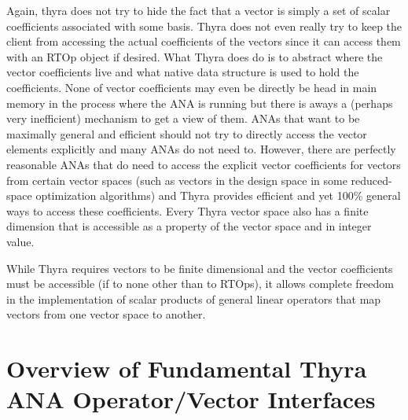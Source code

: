 \documentclass[pdf,ps2pdf,11pt]{SANDreport}
\begin{document}
Again, thyra does not try to hide the fact that a vector is simply a set of
scalar coefficients associated with some basis.  Thyra does not even really
try to keep the client from accessing the actual coefficients of the vectors
since it can access them with an RTOp object if desired.  What Thyra does do
is to abstract where the vector coefficients live and what native data
structure is used to hold the coefficients.  None of vector coefficients may
even be directly be head in main memory in the process where the ANA is
running but there is aways a (perhaps very inefficient) mechanism to get a
view of them.  ANAs that want to be maximally general and efficient should not
try to directly access the vector elements explicitly and many ANAs do not
need to.  However, there are perfectly reasonable ANAs that do need to access
the explicit vector coefficients for vectors from certain vector spaces (such
as vectors in the design space in some reduced-space optimization algorithms)
and Thyra provides efficient and yet 100\% general ways to access these
coefficients.  Every Thyra vector space also has a finite dimension that is
accessible as a property of the vector space and in integer value.

While Thyra requires vectors to be finite dimensional and the vector
coefficients must be accessible (if to none other than to RTOps), it allows
complete freedom in the implementation of scalar products of general linear
operators that map vectors from one vector space to another.

%
\section{Overview of Fundamental Thyra ANA Operator/Vector Interfaces}
\label{thyra:sec:Thyra_core_overview}
%
\end{document}
